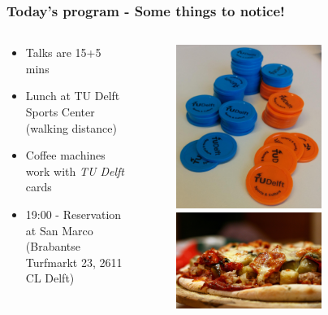\documentclass{beamer}
\begin{document}
\begin{frame}
 \frametitle{Today's program - Some things to notice!}
 \begin{columns}
 \begin{column}{0.6\textwidth}
 \begin{itemize}
  \item Talks are {\color{tudblue}15+5 mins}
  \item {\color{tudblue}Lunch} at TU Delft Sports Center (walking distance)
  \item {\color{tudblue}Coffee} machines work with \textit{TU Delft} cards
  \item 19:00 - Reservation at {\color{tudblue}San Marco} (Brabantse Turfmarkt 23, 2611 CL Delft)
 \end{itemize}

 \end{column}

 \begin{column}{0.4\textwidth}
  \begin{figure}[h]
  \includegraphics[width=0.7\textwidth]{pics/money.jpg}\\ \vspace{0.3cm}
  \includegraphics[width=0.7\textwidth]{pics/Hot_pizza.jpg}
  \end{figure}
 \end{column}
 \end{columns}
\end{frame}
\end{document}

